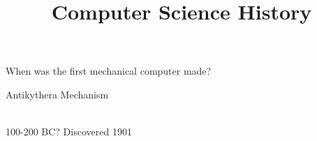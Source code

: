 \documentclass[xcolor={usenames,dvipsnames,svgnames,table},12pt]{beamer}
\title{Computer Science History}
\begin{document}

\begin{frame}
  \begin{center}
    When was the first mechanical computer made?
  \end{center}
\end{frame}

\begin{frame}{Antikythera Mechanism}
  \begin{center}
     \quad
     \\
    100-200 BC?  Discovered 1901
  \end{center}
\end{frame}
\end{document}
